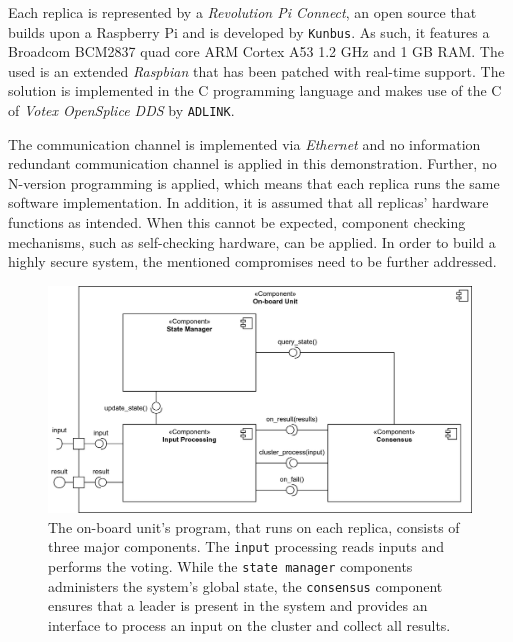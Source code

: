 Each replica is represented by a \textit{Revolution Pi Connect}, an open source  that builds upon a Raspberry Pi and is developed by \texttt{Kunbus}.
As such, it features a Broadcom BCM2837 quad core ARM Cortex A53 1.2 GHz  and 1 GB RAM.
The used  is an extended \textit{Raspbian}  that has been patched with real-time support.
The solution is implemented in the C programming language and makes use of the C  of \textit{Votex OpenSplice DDS} by \texttt{ADLINK}.

The communication channel is implemented via \textit{Ethernet} and no information redundant communication channel is applied in this demonstration.
Further, no N-version programming is applied, which means that each replica runs the same software implementation.
In addition, it is assumed that all replicas' hardware functions as intended.
When this cannot be expected, component checking mechanisms, such as self-checking hardware, can be applied.
In order to build a highly secure system, the mentioned compromises need to be further addressed.

\begin{figure}[!hb]
	\centering
	\includegraphics[width=0.9\linewidth]{images/Components}
	\caption{The on-board unit's program, that runs on each replica, consists of three major components. The \texttt{input} processing reads inputs and performs the voting. While the \texttt{state manager} components administers the system's global state, the \texttt{consensus} component ensures that a leader is present in the system and provides an interface to process an input on the cluster and collect all results.}
	\label{fig:SystemComponents}
\end{figure}

